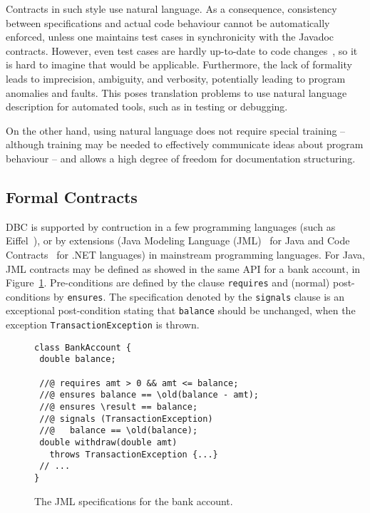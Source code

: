 Contracts in such style use natural language. As a consequence, consistency between specifications and actual code behaviour cannot be automatically enforced, unless one maintains test cases in synchronicity with the Javadoc contracts. However, even test cases are hardly up-to-date to code changes~\cite{}, so it is hard to imagine that would be applicable. 
Furthermore, the lack of formality leads to imprecision, ambiguity, and verbosity, potentially leading to program anomalies and faults.
This poses translation problems to use natural language description for automated tools, such as in testing or debugging.

On the other hand, using natural language does not require special training -- although training may be needed to effectively communicate
ideas about program behaviour -- and allows a high degree of freedom for documentation structuring. 


\subsection{Formal Contracts}


DBC is supported by contruction in a few programming languages (such as Eiffel~\cite{}), or by extensions (Java Modeling Language (JML)~\cite{} for Java and Code Contracts~\cite{} for .NET languages) in mainstream programming languages.
For Java, JML contracts may be defined as showed in the same API for a bank account, in Figure~\ref{Fig-JML-Bank}. Pre-conditions
are defined by the clause {\lstinline!requires!} and (normal) post-conditions by {\lstinline!ensures!}. The specification
denoted by the {\lstinline!signals!} clause
is an exceptional post-condition stating that {\lstinline!balance!} should be unchanged, when the exception \texttt{TransactionExcep\-tion} is thrown.

\begin{figure}
\begin{lstlisting}[basicstyle=\footnotesize\ttfamily,name=figxpi]
class BankAccount {
 double balance;

 //@ requires amt > 0 && amt <= balance;
 //@ ensures balance == \old(balance - amt);
 //@ ensures \result == balance;
 //@ signals (TransactionException) 
 //@   balance == \old(balance);
 double withdraw(double amt) 
   throws TransactionException {...}
 // ...
}
\end{lstlisting}
\caption{The JML specifications for the bank account.}
\label{Fig-JML-Bank}
\end{figure}

